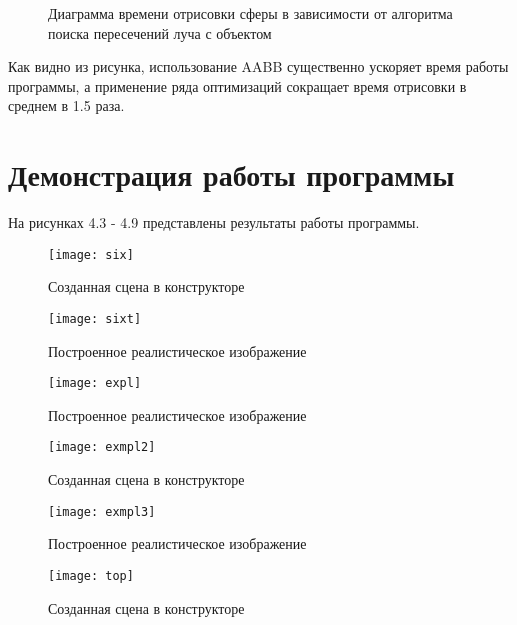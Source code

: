 \documentclass[12pt,a4paper,oneside]{report}
\begin{document}
	
	\begin{figure}[h]
		\centering
		\caption{Диаграмма времени отрисовки сферы в зависимости от алгоритма поиска пересечений луча с объектом}
	\end{figure}
	
	 Как видно из рисунка, использование AABB существенно ускоряет время работы программы, а применение ряда оптимизаций сокращает время отрисовки в среднем в 1.5 раза.
	
	\section{Демонстрация работы программы}
	 \quad На рисунках 4.3 - 4.9 представлены результаты работы программы.
	
	\begin{figure}[H]
		\centering
		\texttt{[image: six]}
		\caption{Созданная сцена в конструкторе}
	\end{figure}

	\begin{figure}[H]
		\centering
		\texttt{[image: sixt]}
		\caption{Построенное реалистическое изображение}
	\end{figure}

	\begin{figure}[H]
		\centering
		\texttt{[image: expl]}
		\caption{Построенное реалистическое изображение}
	\end{figure}
	
	\begin{figure}[H]
		\centering
		\texttt{[image: exmpl2]}
		\caption{Созданная сцена в конструкторе}
	\end{figure}
	
	\begin{figure}[H]
		\centering
		\texttt{[image: exmpl3]}
		\caption{Построенное реалистическое изображение}
	\end{figure}

	\begin{figure}[H]
		\centering
		\texttt{[image: top]}
		\caption{Созданная сцена в конструкторе}
	\end{figure}
	
\end{document}

